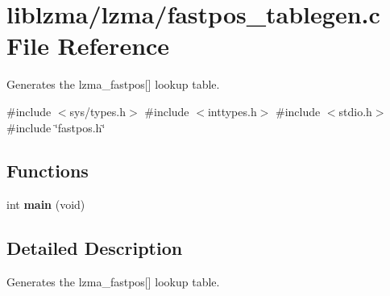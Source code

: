\section{liblzma/lzma/fastpos\+\_\+tablegen.c File Reference}
\label{fastpos__tablegen_8c}


Generates the lzma\+\_\+fastpos[] lookup table.  


{\ttfamily \#include $<$sys/types.\+h$>$}\newline
{\ttfamily \#include $<$inttypes.\+h$>$}\newline
{\ttfamily \#include $<$stdio.\+h$>$}\newline
{\ttfamily \#include \char`\"{}fastpos.\+h\char`\"{}}\newline
\subsection*{Functions}
\begin{DoxyCompactItemize}
\item 
\mbox{\label{fastpos__tablegen_8c_a840291bc02cba5474a4cb46a9b9566fe}} 
int {\bfseries main} (void)
\end{DoxyCompactItemize}


\subsection{Detailed Description}
Generates the lzma\+\_\+fastpos[] lookup table. 


